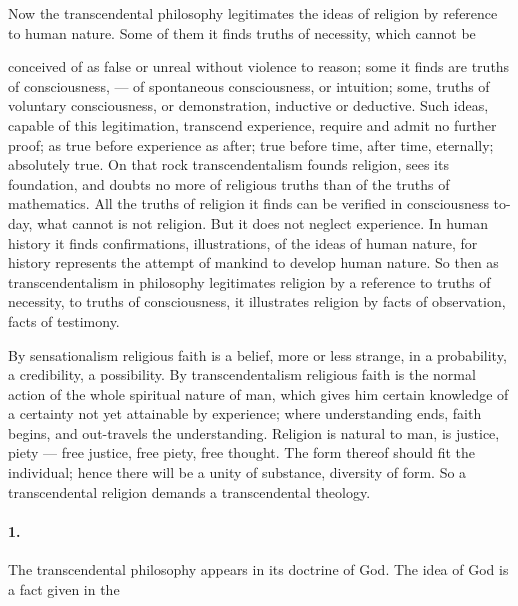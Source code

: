 \documentclass[12pt]{article}
\begin{document}
Now the transcendental philosophy legitimates the 
ideas of religion by reference to human nature. Some 
of them it finds truths of necessity, which cannot be 




conceived of as false or unreal without violence to reason; some it finds are truths of consciousness, --- of 
spontaneous consciousness, or intuition; some, truths of 
voluntary consciousness, or demonstration, inductive or 
deductive. Such ideas, capable of this legitimation, 
transcend experience, require and admit no further 
proof; as true before experience as after; true before 
time, after time, eternally; absolutely true. On that 
rock transcendentalism founds religion, sees its foundation, and doubts no more of religious truths than of 
the truths of mathematics. All the truths of religion 
it finds can be verified in consciousness to-day, what 
cannot is not religion. But it does not neglect experience. In human history it finds confirmations, illustrations, of the ideas of human nature, for history represents the attempt of mankind to develop human nature. 
So then as transcendentalism in philosophy legitimates 
religion by a reference to truths of necessity, to truths 
of consciousness, it illustrates religion by facts of observation, facts of testimony. 

By sensationalism religious faith is a belief, more or 
less strange, in a probability, a credibility, a possibility. By transcendentalism religious faith is the normal action of the whole spiritual nature of man, which 
gives him certain knowledge of a certainty not yet attainable by experience; where understanding ends, faith 
begins, and out-travels the understanding. Religion 
is natural to man, is justice, piety --- free justice, free 
piety, free thought. The form thereof should fit the 
individual; hence there will be a unity of substance, 
diversity of form. So a transcendental religion demands a transcendental theology. 

\paragraph{1.} The transcendental philosophy appears in its doctrine of God. The idea of God is a fact given in the 



\end{document}

